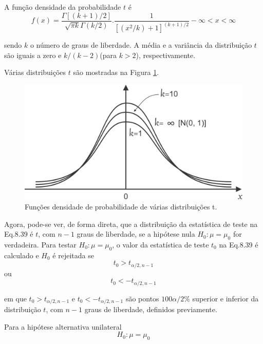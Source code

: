 \documentclass[a4paper,12pt]{article} %
\begin{document}
	A função densidade da probabilidade $t$ é
	\begin{equation*}
		\tag{8.40}
		f(x) = \frac{\Gamma \left[ \left( k + 1 \right) /2 \right] }{\sqrt{ \pi k  }\Gamma \left( k/2 \right)  } . \frac{1}{\left[ \left( x^2 / k \right) + 1  \right]^{\left( k+1 \right)/2 } } - \infty  < x < \infty 
	\end{equation*}

	sendo $k$ o número de graus de liberdade. A média e a variância da distribuição $t$ são iguais a zero e $ k/(k-2) $(para $  k > 2 $), respectivamente.
	
	\hspace{12pt} Várias distribuições $t$ são mostradas na Figura \ref{8.11}.
	
	
	\begin{figure}[H]
		\centering
		\includegraphics[width=0.7\linewidth]{fig1}
		\caption[]{Funções densidade de probabilidade de várias distribuições t.}
		\label{8.11}
	\end{figure}

	Agora, pode-se ver, de forma direta, que a distribuição da estatística de teste na Eq.8.39 é $t$, com $n-1$ graus de liberdade, se a hipótese nula $H_0: \mu = \mu_0$ for verdadeira. Para testar $H_0: \mu = \mu_0$, o valor da estatística de teste $t_0$ na Eq.8.39 é calculado e $H_0$ é rejeitada se
	\begin{equation}
		\tag{8.41a}
		t_0 > t_{\alpha / 2, n-1}
	\end{equation}
	ou
	\begin{equation}
		\tag{8.41b}
		t_0 < - t_{\alpha / 2, n-1}
	\end{equation}

	em que $t_0 > t_{\alpha / 2, n-1}$ e $t_0 < - t_{\alpha / 2, n-1}$ são pontos $100 \alpha / 2 \%$ superior e inferior da distribuição $t$, com $n-1$ graus de liberdade, definidos previamente.
	
	\hspace*{12pt} Para a hipótese alternativa unilateral
	\begin{equation*}
		H_0: \mu = \mu_0
	\end{equation*}
	
\end{document}
